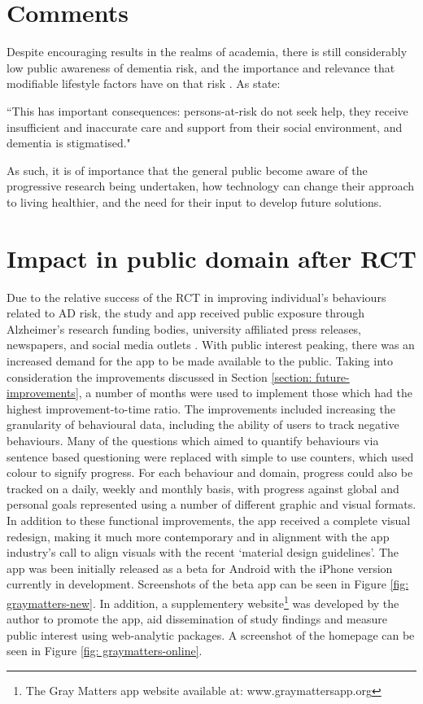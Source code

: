 \section{Comments}
Despite encouraging results in the realms of academia, there is still considerably low public awareness of dementia risk, and the importance and relevance that modifiable lifestyle factors have on that risk \cite{FarrowM2008}. As \citeauthor{Deckers2015} state:
\begin{displayquote}
``This has important consequences: persons-at-risk do not seek help, they receive insufficient and inaccurate care and support from their social environment, and dementia is stigmatised." \cite{Deckers2015}
\end{displayquote}

As such, it is of importance that the general public become aware of the progressive research being undertaken, how technology can change their approach to living healthier, and the need for their input to develop future solutions.

\section{Impact in public domain after RCT}
Due to the relative success of the RCT in improving individual's behaviours related to AD risk, the study and app received public exposure through Alzheimer's research funding bodies, university affiliated press releases, newspapers, and social media outlets \cite{graymatterspress1,graymatterspress2,graymatterspress3,graymatterspress4}. With public interest peaking, there was an increased demand for the app to be made available to the public. Taking into consideration the improvements discussed in Section \ref{section: future-improvements}, a number of months were used to implement those which had the highest improvement-to-time ratio. The improvements included increasing the granularity of behavioural data, including the ability of users to track negative behaviours. Many of the questions which aimed to quantify behaviours via sentence based questioning were replaced with simple to use counters, which used colour to signify progress. For each behaviour and domain, progress could also be tracked on a daily, weekly and monthly basis, with progress against global and personal goals represented using a number of different graphic and visual formats.
In addition to these functional improvements, the app received a complete visual redesign, making it much more contemporary and in alignment with the app industry's call to align visuals with the recent `material design guidelines'. The app was been initially released as a beta for Android with the iPhone version currently in development. Screenshots of the beta app can be seen in Figure \ref{fig: graymatters-new}. In addition, a supplementery website\footnote{The Gray Matters app website available at: www.graymattersapp.org} was developed by the author to promote the app, aid dissemination of study findings and measure public interest using web-analytic packages. A screenshot of the homepage can be seen in Figure \ref{fig: graymatters-online}.

